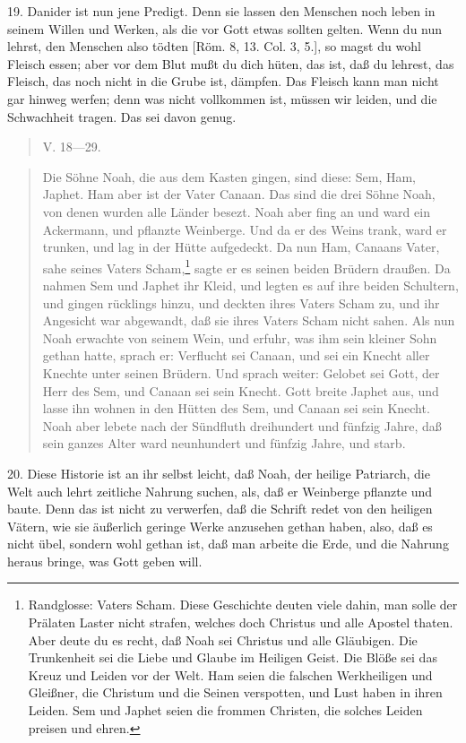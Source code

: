 19. Danider ist nun jene Predigt. Denn sie lassen den Menschen noch leben in seinem Willen und Werken, als die vor Gott etwas sollten gelten. Wenn du nun lehrst, den Menschen also tödten [Röm. 8, 13. Col. 3, 5.], so magst du wohl Fleisch essen; aber vor dem Blut mußt du dich hüten, das ist, daß du lehrest, das Fleisch, das noch nicht in die Grube ist, dämpfen. Das Fleisch kann man nicht gar hinweg werfen; denn was nicht vollkommen ist, müssen wir leiden, und die Schwachheit tragen. Das sei davon genug.

\begin{quote}
V. 18—29.
\end{quote}

\begin{quote}
Die Söhne Noah, die aus dem Kasten gingen, sind diese: Sem, Ham, Japhet. Ham aber ist der Vater Canaan. Das sind die drei Söhne Noah, von denen wurden alle Länder besezt. Noah aber fing an und ward ein Ackermann, und pflanzte Weinberge. Und da er des Weins trank, ward er trunken, und lag in der Hütte aufgedeckt. Da nun Ham, Canaans Vater, sahe seines Vaters Scham,\footnote{Randglosse: Vaters Scham. Diese Geschichte deuten viele dahin, man solle der Prälaten Laster nicht strafen, welches doch Christus und alle Apostel thaten. Aber deute du es recht, daß Noah sei Christus und alle Gläubigen. Die Trunkenheit sei die Liebe und Glaube im Heiligen Geist. Die Blöße sei das Kreuz und Leiden vor der Welt. Ham seien die falschen Werkheiligen und Gleißner, die Christum und die Seinen verspotten, und Lust haben in ihren Leiden. Sem und Japhet seien die frommen Christen, die solches Leiden preisen und ehren.} sagte er es seinen beiden Brüdern draußen. Da nahmen Sem und Japhet ihr Kleid, und legten es auf ihre beiden Schultern, und gingen rücklings hinzu, und deckten ihres Vaters Scham zu, und ihr Angesicht war abgewandt, daß sie ihres Vaters Scham nicht sahen. Als nun Noah erwachte von seinem Wein, und erfuhr, was ihm sein kleiner Sohn gethan hatte, sprach er: Verflucht sei Canaan, und sei ein Knecht aller Knechte unter seinen Brüdern. Und sprach weiter: Gelobet sei Gott, der Herr des Sem, und Canaan sei sein Knecht. Gott breite Japhet aus, und lasse ihn wohnen in den Hütten des Sem, und Canaan sei sein Knecht. Noah aber lebete nach der Sündfluth dreihundert und fünfzig Jahre, daß sein ganzes Alter ward neunhundert und fünfzig Jahre, und starb.
\end{quote}

20. Diese Historie ist an ihr selbst leicht, daß Noah, der heilige Patriarch, die Welt auch lehrt zeitliche Nahrung suchen, als, daß er Weinberge pflanzte und baute. Denn das ist nicht zu verwerfen, daß die Schrift redet von den heiligen Vätern, wie sie äußerlich geringe Werke anzusehen
gethan haben, also, daß es nicht übel, sondern wohl gethan ist, daß man arbeite die Erde, und die Nahrung heraus bringe, was Gott geben will.

